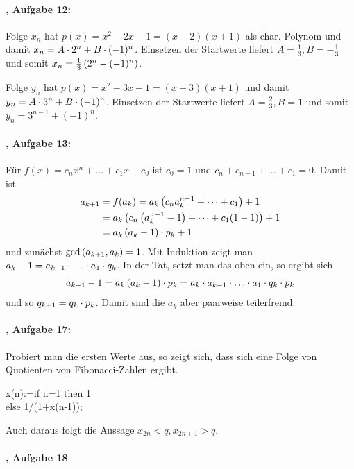 \documentclass[11pt,a4paper]{article}
\begin{document}
\paragraph{\cite{S}, Aufgabe 12:}
Folge $x_n$ hat $p(x)=x^2-2x-1=(x-2)(x+1)$ als char. Polynom und damit
$x_n=A\cdot2^n+B\cdot(-1)^n$.  Einsetzen der Startwerte liefert $A=\frac13,
B=-\frac13$ und somit $x_n=\frac13\left(2^n-(-1)^n\right)$.

Folge $y_n$ hat $p(x)=x^2-3x-1=(x-3)(x+1)$ und damit $y_n=A\cdot3^n+B\cdot(-1)^n$.
Einsetzen der Startwerte liefert $A=\frac23, B=1$ und somit
$y_n=3^{n-1}+(-1)^n$.

\paragraph{\cite{S}, Aufgabe 13:}
Für $f(x)=c_nx^n+\dots+c_1x+c_0$ ist $c_0=1$ und $c_n+c_{n-1}+\dots+c_1=0$.
Damit ist
\begin{align*}
  a_{k+1}&=f(a_k)=a_k\left(c_na_k^{n-1}+\dots+c_1\right)+1\\
  &=a_k\left(c_n\left(a_k^{n-1}-1\right)+\dots+c_1(1-1)\right)+1\\
  &=a_k\left(a_k-1\right)\cdot p_k+1
\end{align*}
und zunächst $\gcd\left(a_{k+1},a_k\right)=1$.  Mit Induktion zeigt man
$a_k-1=a_{k-1}\m\dots\m a_1\m q_k$.  In der Tat, setzt man das oben ein, so
ergibt sich 
\begin{gather*}
  a_{k+1}-1=a_k\br{a_k-1}\m p_k=a_k\m a_{k-1}\m\dots\m a_1\m q_k\m p_k
\end{gather*}
und so $q_{k+1}=q_k\cdot p_k$.  Damit sind die $a_k$ aber paarweise
teilerfremd. 

\paragraph{\cite{S}, Aufgabe 17:}
Probiert man die ersten Werte aus, so zeigt sich, dass sich eine Folge von
Quotienten von Fibonacci-Zahlen ergibt.
\begin{code}
  x(n):=if n=1 then 1\\
  else 1/(1+x(n-1));
\end{code}
Auch daraus folgt die Aussage $x_{2n}<q, x_{2n+1}>q$. 

\paragraph{\cite{S}, Aufgabe 18}
\end{document}
